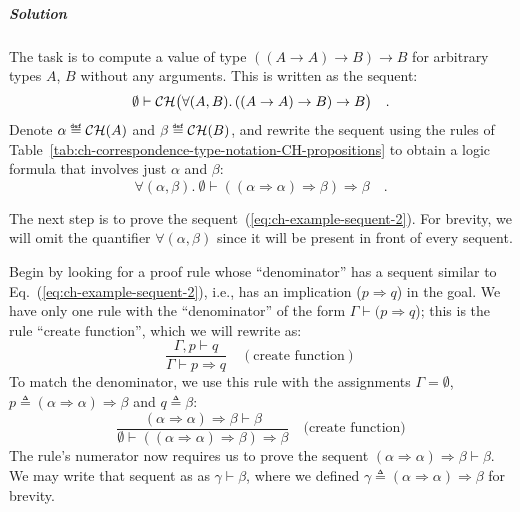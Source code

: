 \subparagraph{Solution}

The task is to compute a value of type $((A\rightarrow A)\rightarrow B)\rightarrow B$
for arbitrary types $A$, $B$ without any arguments. This is written
as the sequent: 
\[
\emptyset\vdash{\cal CH}\big(\forall(A,B).\,((A\rightarrow A)\rightarrow B)\rightarrow B\big)\quad.
\]
Denote $\alpha\triangleq{\cal CH}(A)$ and $\beta\triangleq{\cal CH}(B)$,
and rewrite the sequent using the rules of Table~\ref{tab:ch-correspondence-type-notation-CH-propositions}
to obtain a logic formula that involves just $\alpha$ and $\beta$:
\begin{equation}
\forall(\alpha,\beta).~\emptyset\vdash((\alpha\Rightarrow\alpha)\Rightarrow\beta)\Rightarrow\beta\quad.\label{eq:ch-example-sequent-2}
\end{equation}

The next step is to prove the sequent~(\ref{eq:ch-example-sequent-2}).
For brevity, we will omit the quantifier $\forall(\alpha,\beta)$
since it will be present in front of every sequent.

Begin by looking for a proof rule whose \textsf{``}denominator\textsf{''} has a sequent
similar to Eq.~(\ref{eq:ch-example-sequent-2}), i.e., has an implication
($p\Rightarrow q$) in the goal. We have only one rule with the \textsf{``}denominator\textsf{''}
of the form $\Gamma\vdash(p\Rightarrow q$); this is the rule \textsf{``}$\text{create function}$\textsf{''},
which we will rewrite as:
\[
\frac{\Gamma,p\vdash q}{\Gamma\vdash p\Rightarrow q}\quad(\text{create function})
\]
To match the denominator, we use this rule with the assignments $\Gamma=\emptyset$,
$p\triangleq(\alpha\Rightarrow\alpha)\Rightarrow\beta$ and $q\triangleq\beta$:
\[
\frac{(\alpha\Rightarrow\alpha)\Rightarrow\beta\vdash\beta}{\emptyset\vdash((\alpha\Rightarrow\alpha)\Rightarrow\beta)\Rightarrow\beta}\quad\text{(create function)}
\]
The rule\textsf{'}s numerator now requires us to prove the sequent $(\alpha\Rightarrow\alpha)\Rightarrow\beta\vdash\beta$.
We may write that sequent as as $\gamma\vdash\beta$, where we defined
$\gamma\triangleq(\alpha\Rightarrow\alpha)\Rightarrow\beta$ for brevity.


